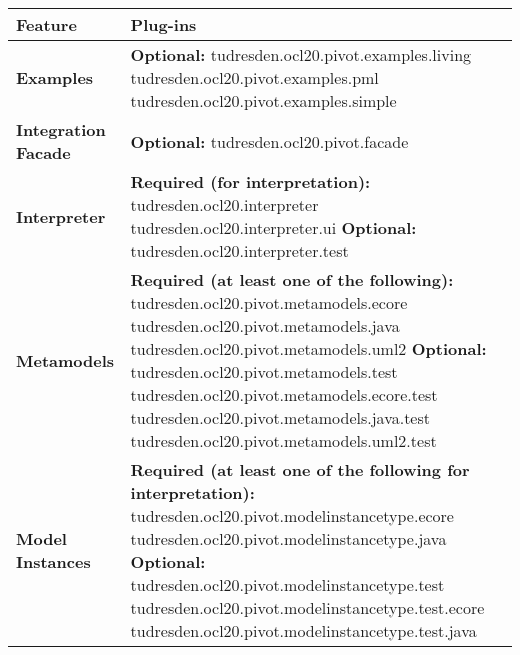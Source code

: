 \begin{table}[h]
\begin{tabular}{|p{4cm}|p{10cm}|}
    \hline
    \textbf{Feature} & \textbf{Plug-ins} \\
    \hline

    \textbf{Examples} &
    \textbf{Optional:}\newline
    tudresden.ocl20.pivot.examples.living\newline
    tudresden.ocl20.pivot.examples.pml\newline
    tudresden.ocl20.pivot.examples.simple\\
    \hline

    \textbf{Integration Facade} &
    \textbf{Optional:}\newline
    tudresden.ocl20.pivot.facade\\
    \hline

    \textbf{Interpreter} &
    \textbf{Required (for interpretation):}\newline
    tudresden.ocl20.interpreter\newline
    tudresden.ocl20.interpreter.ui\newline\newline
    \textbf{Optional:}\newline
    tudresden.ocl20.interpreter.test\\
    \hline
 
    \textbf{Metamodels} &
    \textbf{Required (at least one of the following):}\newline
    tudresden.ocl20.pivot.metamodels.ecore\newline
    tudresden.ocl20.pivot.metamodels.java\newline
    tudresden.ocl20.pivot.metamodels.uml2\newline\newline
    \textbf{Optional:}\newline
    tudresden.ocl20.pivot.metamodels.test\newline
    tudresden.ocl20.pivot.metamodels.ecore.test\newline
    tudresden.ocl20.pivot.metamodels.java.test\newline
    tudresden.ocl20.pivot.metamodels.uml2.test\\
    \hline
 
    \textbf{Model Instances} &
    \textbf{Required (at least one of the following for interpretation):}\newline
    tudresden.ocl20.pivot.modelinstancetype.ecore\newline
    tudresden.ocl20.pivot.modelinstancetype.java\newline\newline
    \textbf{Optional:}\newline
    tudresden.ocl20.pivot.modelinstancetype.test\newline
    tudresden.ocl20.pivot.modelinstancetype.test.ecore\newline
    tudresden.ocl20.pivot.modelinstancetype.test.java\\
    \hline
 

\end{tabular}
\end{table}
